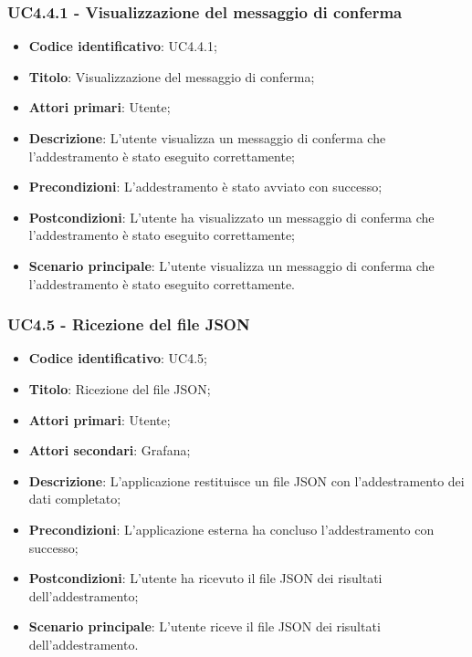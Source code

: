\subsubsection{UC4.4.1 - Visualizzazione del messaggio di conferma}
\begin{itemize}
	\item \textbf{Codice identificativo}: UC4.4.1;
	\item \textbf{Titolo}: Visualizzazione del messaggio di conferma;
	\item \textbf{Attori primari}: Utente;
	\item \textbf{Descrizione}: L'utente visualizza un messaggio di conferma che l'addestramento è stato eseguito correttamente;
	\item \textbf{Precondizioni}: L'addestramento è stato avviato con successo;
	\item \textbf{Postcondizioni}: L'utente ha visualizzato un messaggio di conferma che l'addestramento è stato eseguito correttamente;
	\item \textbf{Scenario principale}: L'utente visualizza un messaggio di conferma che l'addestramento è stato eseguito correttamente.
\end{itemize}


\subsubsection{UC4.5 - Ricezione del file JSON}
\begin{itemize}
    \item \textbf{Codice identificativo}: UC4.5;
    \item \textbf{Titolo}: Ricezione del file JSON;
    \item \textbf{Attori primari}: Utente;
    \item \textbf{Attori secondari}: Grafana\glo;
    \item \textbf{Descrizione}: L'applicazione restituisce un file JSON con l'addestramento dei dati completato;
    \item \textbf{Precondizioni}: L'applicazione esterna ha concluso l'addestramento con successo;
    \item \textbf{Postcondizioni}: L'utente ha ricevuto il file JSON dei risultati dell'addestramento;
    \item \textbf{Scenario principale}: L'utente riceve il file JSON dei risultati dell'addestramento.
\end{itemize}